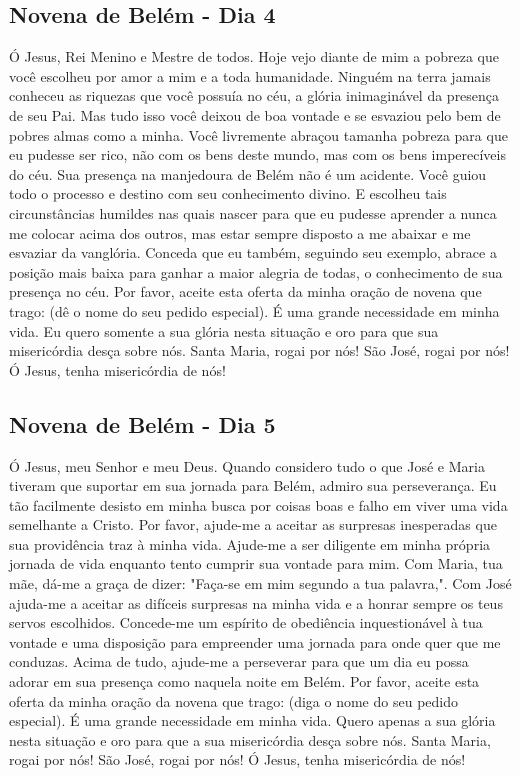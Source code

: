 \documentclass[a4paper,14pt,twoside]{extarticle} \usepackage[utf8]{inputenc}
\begin{document}
\subsection{Novena de Belém - Dia 4}

Ó Jesus, Rei Menino e Mestre de todos. Hoje vejo diante de mim a pobreza que você escolheu por amor a mim e a toda humanidade. Ninguém na terra jamais conheceu as riquezas que você possuía no céu, a glória inimaginável da presença de seu Pai. Mas tudo isso você deixou de boa vontade e se esvaziou pelo bem de pobres almas como a minha. Você livremente abraçou tamanha pobreza para que eu pudesse ser rico, não com os bens deste mundo, mas com os bens imperecíveis do céu. Sua presença na manjedoura de Belém não é um acidente. Você guiou todo o processo e destino com seu conhecimento divino. E escolheu tais circunstâncias humildes nas quais nascer para que eu pudesse aprender a nunca me colocar acima dos outros, mas estar sempre disposto a me abaixar e me esvaziar da vanglória. Conceda que eu também, seguindo seu exemplo, abrace a posição mais baixa para ganhar a maior alegria de todas, o conhecimento de sua presença no céu. Por favor, aceite esta oferta da minha oração de novena que trago: (dê o nome do seu pedido especial). É uma grande necessidade em minha vida. Eu quero somente a sua glória nesta situação e oro para que sua misericórdia desça sobre nós. Santa Maria, rogai por nós! São José, rogai por nós! Ó Jesus, tenha misericórdia de nós!

\subsection{Novena de Belém - Dia 5}

Ó Jesus, meu Senhor e meu Deus. Quando considero tudo o que José e Maria tiveram que suportar em sua jornada para Belém, admiro sua perseverança. Eu tão facilmente desisto em minha busca por coisas boas e falho em viver uma vida semelhante a Cristo. Por favor, ajude-me a aceitar as surpresas inesperadas que sua providência traz à minha vida. Ajude-me a ser diligente em minha própria jornada de vida enquanto tento cumprir sua vontade para mim. Com Maria, tua mãe, dá-me a graça de dizer: "Faça-se em mim segundo a tua palavra,". Com José ajuda-me a aceitar as difíceis surpresas na minha vida e a honrar sempre os teus servos escolhidos. Concede-me um espírito de obediência inquestionável à tua vontade e uma disposição para empreender uma jornada para onde quer que me conduzas. Acima de tudo, ajude-me a perseverar para que um dia eu possa adorar em sua presença como naquela noite em Belém. Por favor, aceite esta oferta da minha oração da novena que trago: (diga o nome do seu pedido especial). É uma grande necessidade em minha vida. Quero apenas a sua glória nesta situação e oro para que a sua misericórdia desça sobre nós. Santa Maria, rogai por nós! São José, rogai por nós! Ó Jesus, tenha misericórdia de nós!
\end{document}
